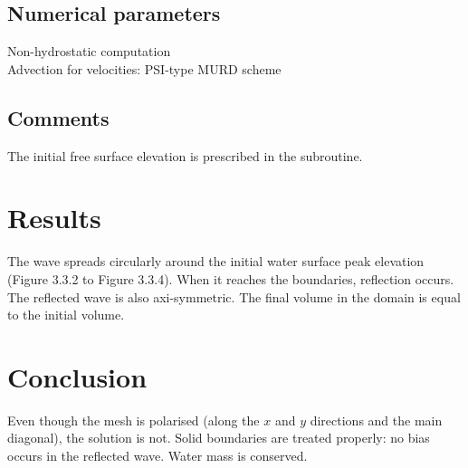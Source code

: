 \subsection{Numerical parameters}
%
Non-hydrostatic computation\\
Advection for velocities: PSI-type MURD scheme
%
\subsection{Comments}
%
The initial free surface elevation is prescribed in the 
subroutine.
%
%
%
\section{Results}
%
The wave spreads circularly around the initial water surface peak
elevation (Figure 3.3.2 to Figure 3.3.4).
When it reaches the boundaries, reflection occurs.
The reflected wave is also axi-symmetric.
The final volume in the domain is equal to the initial volume.
%
\section{Conclusion}
%
Even though the mesh is polarised (along the $x$ and $y$ directions and
the main diagonal), the solution is not.
Solid boundaries are treated properly: no bias occurs in the reflected
wave.
Water mass is conserved.
%
%
